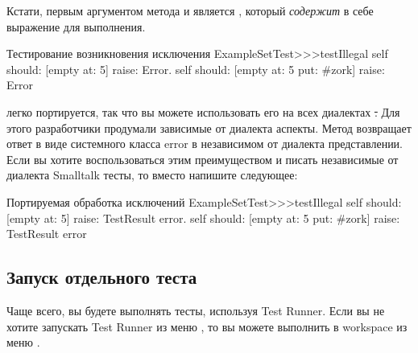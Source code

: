 \documentclass[a4paper,10pt,twoside]{book}
\begin{document}
Кстати, первым аргументом метода  и  является ,
который \emph{содержит} в себе выражение для выполнения. 

\begin{method}[ESTtestIllegal]{Тестирование возникновения исключения}
ExampleSetTest>>>testIllegal
	self should: [empty at: 5] raise: Error.
	self should: [empty at: 5 put: #zork] raise: Error
\end{method}

\sunit легко портируется, так что вы можете использовать его на всех диалектах \st.
Для этого разработчики продумали зависимые от диалекта аспекты.
Метод 
возвращает ответ в виде системного класса error в независимом от диалекта представлении.
Если вы хотите воспользоваться этим преимуществом и писать независимые от диалекта Smalltalk тесты,
то вместо  напишите следующее:

\begin{method}[portabletestillegal]{Портируемая обработка исключений}
ExampleSetTest>>>testIllegal
	self should: [empty at: 5] raise: TestResult error.
	self should: [empty at: 5 put: #zork] raise: TestResult error
\end{method}


\subsection{Запуск отдельного теста}
Чаще всего, вы будете выполнять тесты, используя Test Runner.
Если вы не хотите запускать Test Runner из меню ,
то вы можете выполнить  в workspace из меню .
\end{document}
